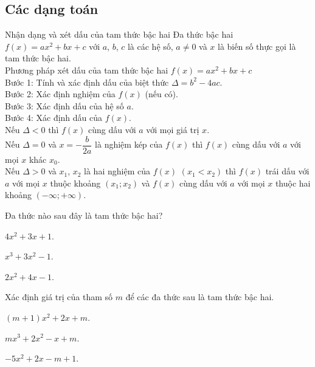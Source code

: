 \subsection{Các dạng toán}
\begin{dang}{Nhận dạng và xét dấu của tam thức bậc hai}
	Đa thức bậc hai $f(x)=ax^2+bx+c$ với $a$, $b$, $c$ là các hệ số, $a\ne 0$ và $x$ là biến số thực gọi là tam thức bậc hai.\\
	Phương pháp xét dấu của tam thức bậc hai $f(x)=ax^2+bx+c$\\
	Bước 1: Tính và xác định dấu của biệt thức $\Delta=b^2-4ac$.\\
	Bước 2: Xác định nghiệm của $f(x)$ (nếu có).\\
	Bước 3: Xác định dấu của hệ số $a$.\\
	Bước 4: Xác định dấu của $f(x)$.\\
	Nếu $\Delta <0$ thì $f(x)$ cùng dấu với $a$ với mọi giá trị $x$.\\
	Nếu $\Delta =0$ và $x=-\dfrac{b}{2a}$ là nghiệm kép của $f(x)$ thì $f(x)$ cùng dấu với $a$ với mọi $x$ khác $x_0$.\\
	Nếu $\Delta>0$ và $x_1$, $x_2$ là hai nghiệm của $f(x)$ $(x_1<x_2)$ thì $f(x)$ trái dấu với $a$ với mọi $x$ thuộc khoảng $(x_1;x_2)$ và $f(x)$ cùng dấu với $a$ với mọi $x$ thuộc hai khoảng $(-\infty;+\infty)$.
\end{dang}
\viduminhhoa
\begin{vd}%
	Đa thức nào sau đây là tam thức bậc hai?
	\begin{listEX}[3]
	\item $4x^2+3x+1$.
	\item $x^3+3x^2-1$.
	\item $2x^2+4x-1$.
	\end{listEX}
\end{vd}
\begin{vd}%
	Xác định giá trị của tham số $m$ để các đa thức sau là tam thức bậc hai.
	\begin{listEX}[3]
	\item $(m+1)x^2+2x+m$.
	\item $mx^3+2x^2-x+m$.
	\item $-5x^2+2x-m+1$.
	\end{listEX}
\end{vd}
